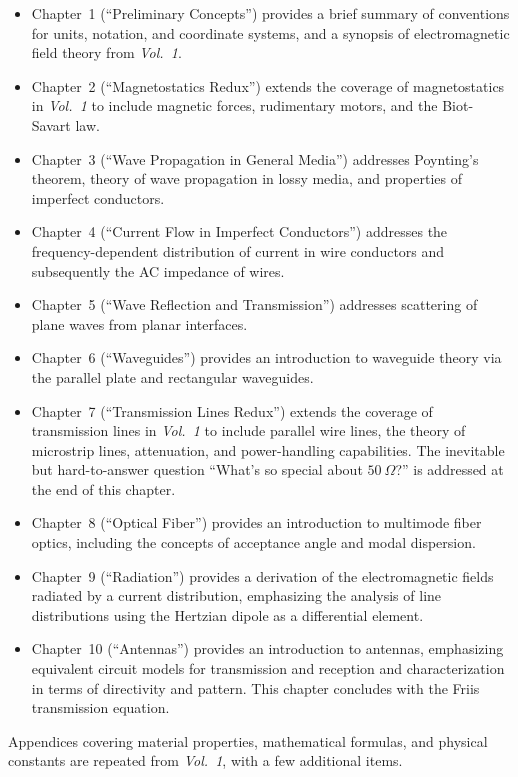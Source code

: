 \begin{itemize}
\item Chapter~1 (``Preliminary Concepts'') provides a brief summary of conventions for units, notation, and coordinate systems, and a synopsis of electromagnetic field theory from \emph{Vol.~1}.
\item Chapter~2 (``Magnetostatics Redux'') extends the coverage of magnetostatics in \emph{Vol.~1} to include magnetic forces, rudimentary motors, and the Biot-Savart law.
\item Chapter~3 (``Wave Propagation in General Media'') addresses Poynting's theorem, theory of wave propagation in lossy media, and properties of imperfect conductors.
\item Chapter~4 (``Current Flow in Imperfect Conductors'') addresses the frequency-dependent distribution of current in wire conductors and subsequently the AC impedance of wires.  
\item Chapter~5 (``Wave Reflection and Transmission'') addresses scattering of plane waves from planar interfaces.
\item Chapter~6 (``Waveguides'') provides an introduction to waveguide theory via the parallel plate and rectangular waveguides.
\item Chapter~7 (``Transmission Lines Redux'') extends the coverage of transmission lines in \emph{Vol.~1} to include parallel wire lines, the theory of microstrip lines, attenuation, and power-handling capabilities.  The inevitable but hard-to-answer question ``What's so special about $50~\Omega$?'' is addressed at the end of this chapter.
\item Chapter~8 (``Optical Fiber'') provides an introduction to multimode fiber optics, including the concepts of acceptance angle and modal dispersion.
\item Chapter~9 (``Radiation'') provides a derivation of the electromagnetic fields radiated by a current distribution, emphasizing the analysis of line distributions using the Hertzian dipole as a differential element.
\item Chapter~10 (``Antennas'') provides an introduction to antennas, emphasizing equivalent circuit models for transmission and reception and characterization in terms of directivity and pattern.  This chapter concludes with the Friis transmission equation. 
\end{itemize}
%
Appendices covering material properties, mathematical formulas, and physical constants are repeated from \emph{Vol.~1}, with a few additional items.
 
